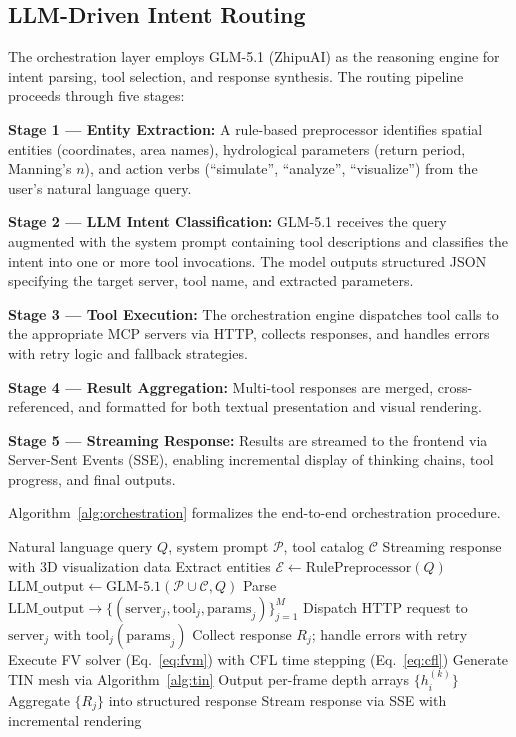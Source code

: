 \documentclass[11pt, a4paper]{article}
\begin{document}
\subsection{LLM-Driven Intent Routing}

The orchestration layer employs GLM-5.1 (ZhipuAI) as the reasoning engine for intent parsing, tool selection, and response synthesis. The routing pipeline proceeds through five stages:

\textbf{Stage 1 --- Entity Extraction:} A rule-based preprocessor identifies spatial entities (coordinates, area names), hydrological parameters (return period, Manning's $n$), and action verbs (``simulate'', ``analyze'', ``visualize'') from the user's natural language query.

\textbf{Stage 2 --- LLM Intent Classification:} GLM-5.1 receives the query augmented with the system prompt containing tool descriptions and classifies the intent into one or more tool invocations. The model outputs structured JSON specifying the target server, tool name, and extracted parameters.

\textbf{Stage 3 --- Tool Execution:} The orchestration engine dispatches tool calls to the appropriate MCP servers via HTTP, collects responses, and handles errors with retry logic and fallback strategies.

\textbf{Stage 4 --- Result Aggregation:} Multi-tool responses are merged, cross-referenced, and formatted for both textual presentation and visual rendering.

\textbf{Stage 5 --- Streaming Response:} Results are streamed to the frontend via Server-Sent Events (SSE), enabling incremental display of thinking chains, tool progress, and final outputs.

Algorithm~\ref{alg:orchestration} formalizes the end-to-end orchestration procedure.

\begin{algorithm}[htbp]
\caption{LLM-Orchestrated Hydrodynamic Simulation Pipeline}
\label{alg:orchestration}
\begin{algorithmic}[1]
\REQUIRE Natural language query $Q$, system prompt $\mathcal{P}$, tool catalog $\mathcal{C}$
\ENSURE Streaming response with 3D visualization data
\STATE Extract entities $\mathcal{E} \leftarrow \text{RulePreprocessor}(Q)$
\STATE $\text{LLM\_output} \leftarrow \text{GLM-5.1}(\mathcal{P} \cup \mathcal{C}, Q)$
\STATE Parse $\text{LLM\_output} \to \{(\text{server}_j, \text{tool}_j, \text{params}_j)\}_{j=1}^{M}$
  \STATE Dispatch HTTP request to $\text{server}_j$ with $\text{tool}_j(\text{params}_j)$
  \STATE Collect response $R_j$; handle errors with retry
\ENDFOR
{}
  \STATE Execute FV solver (Eq.~\ref{eq:fvm}) with CFL time stepping (Eq.~\ref{eq:cfl})
  \STATE Generate TIN mesh via Algorithm~\ref{alg:tin}
  \STATE Output per-frame depth arrays $\{h_i^{(k)}\}$
\ENDIF
\STATE Aggregate $\{R_j\}$ into structured response
\STATE Stream response via SSE with incremental rendering
\end{algorithmic}
\end{algorithm}
\end{document}
